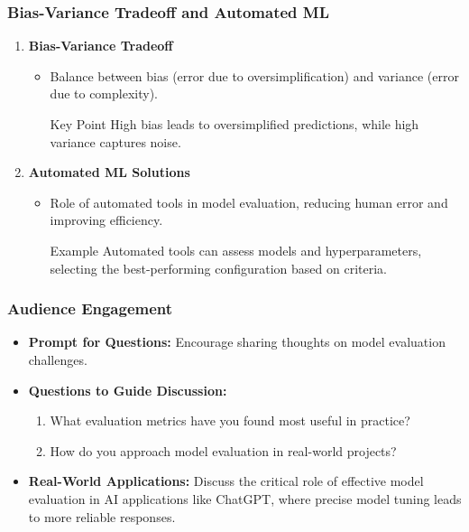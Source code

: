 \documentclass[aspectratio=169]{beamer}
\begin{document}
\begin{frame}[fragile]
    \frametitle{Bias-Variance Tradeoff and Automated ML}
    \begin{enumerate}    
        \item \textbf{Bias-Variance Tradeoff}
            \begin{itemize}
                \item Balance between bias (error due to oversimplification) and variance (error due to complexity).
                
                \begin{block}{Key Point}
                    High bias leads to oversimplified predictions, while high variance captures noise.
                \end{block}
            \end{itemize}
        
        \item \textbf{Automated ML Solutions}
            \begin{itemize}
                \item Role of automated tools in model evaluation, reducing human error and improving efficiency.
                
                \begin{block}{Example}
                    Automated tools can assess models and hyperparameters, selecting the best-performing configuration based on criteria.
                \end{block}
            \end{itemize}
    \end{enumerate}
\end{frame}

\begin{frame}[fragile]
    \frametitle{Audience Engagement}
    \begin{itemize}
        \item \textbf{Prompt for Questions:} Encourage sharing thoughts on model evaluation challenges.
        
        \item \textbf{Questions to Guide Discussion:}
            \begin{enumerate}
                \item What evaluation metrics have you found most useful in practice?
                \item How do you approach model evaluation in real-world projects?
            \end{enumerate}
        
        \item \textbf{Real-World Applications:}
            Discuss the critical role of effective model evaluation in AI applications like ChatGPT, where precise model tuning leads to more reliable responses.
    \end{itemize}
\end{frame}
\end{document}
